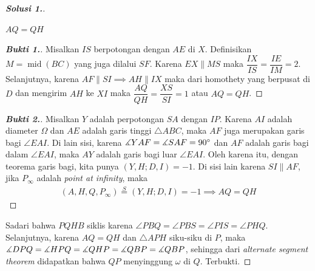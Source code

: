 \begin{proof}[\textbf{Solusi 1.}]
    \begin{lemmarev}\label{lemmaimo2023}
        $AQ=QH$
        \begin{proof}[\textbf{Bukti 1.}] Misalkan $IS$ berpotongan dengan $AE$ di $X$. Definisikan $M = \operatorname{mid}(BC)$ yang juga dilalui $SF$. Karena $EX \parallel MS$ maka $\dfrac{IX}{IS} = \dfrac{IE}{IM} = 2$. Selanjutnya, karena $AF \parallel SI \implies AH \parallel IX$ maka dari homothety yang berpusat di $D$ dan mengirim $AH$ ke $XI$ maka $\dfrac{AQ}{QH} = \dfrac{XS}{SI}= 1$ atau $AQ=QH$.
        \end{proof}
        \begin{proof}[\textbf{Bukti 2.}] Misalkan $Y$ adalah perpotongan $SA$ dengan $IP$. Karena $AI$ adalah diameter $\Omega$ dan $AE$ adalah garis tinggi $\triangle ABC$, maka $AF$ juga merupakan garis bagi $\angle EAI$. Di lain sisi, karena $\measuredangle YAF = \measuredangle SAF = 90^\circ$ dan $AF$ adalah garis bagi dalam $\angle EAI$, maka $AY$ adalah garis bagi luar $\angle EAI$. Oleh karena itu, dengan teorema garis bagi, kita punya $(Y,H;D,I)=-1$. Di sisi lain karena $SI \parallel AF$, jika $P_\infty$ adalah \textit{point at infinity}, maka
        \begin{align*}
             (A,H,Q,P_\infty)\stackrel{S}{=} (Y,H;D,I) = -1  \implies AQ=QH
        \end{align*}
        \end{proof}
    \end{lemmarev}

    Sadari bahwa $PQHB$ siklis karena $\angle PBQ = \angle PBS = \angle PIS = \angle PHQ$. Selanjutnya, karena $AQ=QH$ dan $\triangle APH$ siku-siku di $P$, maka $\measuredangle DPQ = \measuredangle HPQ = \measuredangle QHP = \measuredangle QBP = \measuredangle QBP$, sehingga dari \textit{alternate segment theorem} didapatkan bahwa $QP$ menyinggung $\omega$ di $Q$. Terbukti.
\end{proof} 

